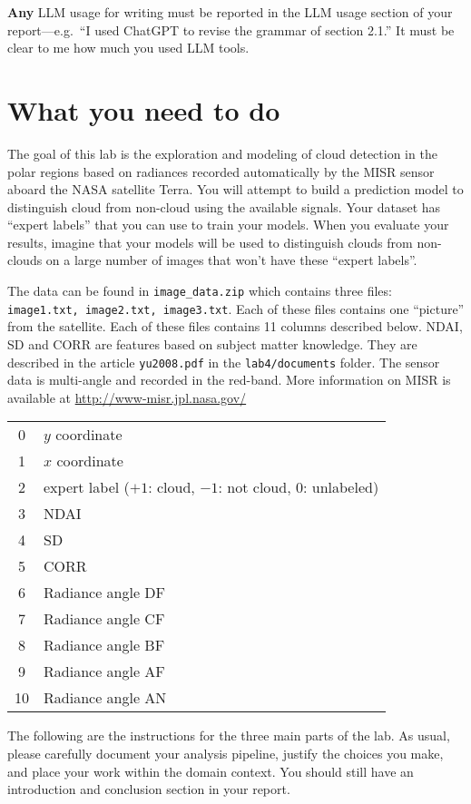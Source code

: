 \documentclass[letterpaper,12pt]{article}
\begin{document}
\textbf{Any} LLM usage for writing must be reported in the LLM usage section of your report---e.g.~``I used ChatGPT to revise the grammar of section 2.1.'' It must be clear to me how much you used LLM tools.

\section{What you need to do}

The goal of this lab is the exploration and modeling of cloud detection in the polar regions based on radiances recorded automatically by the MISR sensor aboard the NASA satellite Terra. You will attempt to build a prediction model to distinguish cloud from non-cloud using the available signals. Your dataset has ``expert labels'' that you can use to train your models. When you evaluate your results, imagine that your models will be used to distinguish clouds from non-clouds on a large number of images that won't have these ``expert labels''.

The data can be found in \texttt{image\_data.zip} which contains three files: \texttt{image1.txt, image2.txt, image3.txt}.
Each of these files contains one ``picture'' from the satellite. Each of these files contains 11 columns described below. NDAI, SD and CORR are features based on subject matter knowledge. They are described in the article \texttt{yu2008.pdf} in the \texttt{lab4/documents} folder. The sensor data is multi-angle and recorded in the red-band. More information on MISR is available at \url{http://www-misr.jpl.nasa.gov/}

{\centering
\begin{tabular}{c|l}
    0 & $y$ coordinate \\
    1 & $x$ coordinate \\
    2 & expert label ($+1$: cloud, $-1$: not cloud, $0$: unlabeled) \\
    3 & NDAI \\
    4 & SD \\
    5 & CORR \\
    6 & Radiance angle DF \\
    7 & Radiance angle CF \\
    8 & Radiance angle BF \\
    9 & Radiance angle AF \\
    10 & Radiance angle AN
\end{tabular}\par
}

The following are the instructions for the three main parts of the lab. As usual, please carefully document your analysis pipeline, justify the choices you make, and place your work within the domain context. You should still have an introduction and conclusion section in your report.
\end{document}
